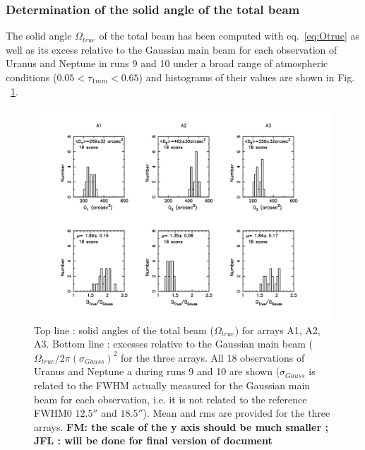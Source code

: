 \subsubsection{Determination of the solid angle of the total beam}
\label{S:solang}


The solid angle $\Omega_{true}$ of the total beam has been computed with  eq.~\ref{eq:Otrue}
as well as its excess relative to the Gaussian main beam 
for each  observation of Uranus and Neptune in  runs 9 and 10 under a broad range of atmospheric conditions
($0.05 < \tau_{1mm} < 0.65$)  and histograms of their values are shown in Fig. ~\ref{fig:Otrue}.

\begin{figure}[th]
\begin{center}
  \includegraphics[clip, angle=0, scale=0.6]{Figures/Hist_omega_true_and_excess.pdf}
  \caption{Top line : solid angles of the total beam
    ($\Omega_{true}$) for arrays A1, A2, A3. Bottom line :  excesses relative to the Gaussian main beam
   ($\Omega_{true} / 2 \pi (\sigma_{Gauss})^2$ for the three
   arrays. All 18 observations of Uranus and Neptune a
   during runs 9 and 10 are shown ($\sigma_{Gauss}$ is related to the FWHM actually measured for the
   Gaussian main beam for each observation, i.e. it is not related to the reference FWHM0 $12.5''$ and $18.5''$).
   Mean and rms are provided for the three arrays. {\bf FM: the scale of the
     y axis should be much smaller ; JFL : will be done for final
    version of document}}
\label{fig:Otrue}
\end{center}
\end{figure}

